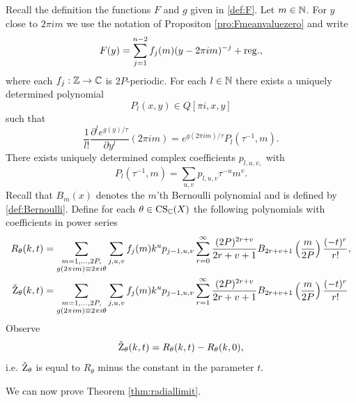 Recall the definition the functions $F$ and $g$ given in \eqref{def:F}. Let $m\in \mathbb{N}$. For $y$ close to $2 \pi im$ we use the notation of Propositon \ref{pro:Fmeanvaluezero} and write
$$F(y)= \sum_{j=1}^{n-2} f_j(m) (y-2\pi im)^{-j}+\rm{reg.},$$
where each $f_j: \mathbb{Z}\rightarrow \mathbb{C}$ is $2P$-periodic. For each $l\in \mathbb{N}$ there exists a uniquely determined polynomial \begin{equation} \label{def:Taylorcoefficients}
P_l(x,y) \in Q[\pi i,x,y]
\end{equation} such that 
\begin{equation} \label{eq:Taylorcoefficients}
\frac{1}{l!}\frac{\partial^l e^{g(y)/\tau}}{\partial y^l}(2\pi i m)= e^{g(2\pi im)/\tau} P_l(\tau^{-1},m).
\end{equation}
There exists uniquely determined complex coefficients $p_{l,u,v,}$ with
\begin{equation}
P_{l}(\tau^{-1},m)= \sum_{u,v} p_{l,u,v} \tau^{-u} m^v.
\end{equation}
Recall that $B_m(x)$ denotes the $m$'th Bernoulli polynomial and is defined by \eqref{def:Bernoulli}. Define for each $\theta \in \operatorname{CS}_{\mathbb{C}}(X)$ the following  polynomials with coefficients in power series
\begin{align} \begin{split}  \label{def:Rtheta}
R_{\theta}(k,t) &= \sum_{\substack{m=1,...,2P, \\ g(2\pi im) \equiv 2\pi i\theta }} \sum_{j,u,v}  f_j(m) k^up_{j-1,u,v}  \sum_{r=0}^{\infty}  \frac{(2P)^{2r+v}}{2r+v+1}  B_{2r+v+1}\left(\frac{m}{2P}\right) \frac{(-t)^r}{r!},
\\ \check{\operatorname{Z}}_{\theta}(k,t) &= \sum_{\substack{m=1,...,2P, \\ g(2\pi im) \equiv 2\pi i\theta }} \sum_{j,u,v}  f_j(m) k^up_{j-1,u,v}  \sum_{r=1}^{\infty}  \frac{(2P)^{2r+v}}{2r+v+1}  B_{2r+v+1}\left(\frac{m}{2P}\right) \frac{(-t)^r}{r!}
\end{split} 
\end{align}
Observe $$\check{\operatorname{Z}}_{\theta}(k,t)=R_{\theta}(k,t)-R_{\theta}(k,0),$$
i.e. $\check{\operatorname{Z}}_{\theta}$ is equal to $R_{\theta}$ minus the constant in the parameter $t$.

We can now prove Theorem \ref{thm:radiallimit}.

